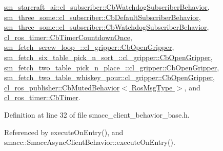 \hyperlink{classsm__starcraft__ai_1_1cl__subscriber_1_1CbWatchdogSubscriberBehavior_a74aa8ecc420589bda47b90877bc120a7}{sm\+\_\+starcraft\+\_\+ai\+::cl\+\_\+subscriber\+::\+Cb\+Watchdog\+Subscriber\+Behavior}, \hyperlink{classsm__three__some_1_1cl__subscriber_1_1CbDefaultSubscriberBehavior_a9d1f8dfb490a26b1fcdab1b740436837}{sm\+\_\+three\+\_\+some\+::cl\+\_\+subscriber\+::\+Cb\+Default\+Subscriber\+Behavior}, \hyperlink{classsm__three__some_1_1cl__subscriber_1_1CbWatchdogSubscriberBehavior_a6bd938abf54a95555182345a5e53cafe}{sm\+\_\+three\+\_\+some\+::cl\+\_\+subscriber\+::\+Cb\+Watchdog\+Subscriber\+Behavior}, \hyperlink{classcl__ros__timer_1_1CbTimerCountdownOnce_a613662c4a4106ece0ce1dee198d1aba2}{cl\+\_\+ros\+\_\+timer\+::\+Cb\+Timer\+Countdown\+Once}, \hyperlink{classsm__fetch__screw__loop__1_1_1cl__gripper_1_1CbOpenGripper_a2d50cf912c699839eda7c15a490e0b9f}{sm\+\_\+fetch\+\_\+screw\+\_\+loop\+\_\+::cl\+\_\+gripper\+::\+Cb\+Open\+Gripper}, \hyperlink{classsm__fetch__six__table__pick__n__sort__1_1_1cl__gripper_1_1CbOpenGripper_a78ac2d4b93c877f2f5786394b1e3afb6}{sm\+\_\+fetch\+\_\+six\+\_\+table\+\_\+pick\+\_\+n\+\_\+sort\+\_\+::cl\+\_\+gripper\+::\+Cb\+Open\+Gripper}, \hyperlink{classsm__fetch__two__table__pick__n__place__1_1_1cl__gripper_1_1CbOpenGripper_a08f95a8f05e33c1a04b77fa5f3465d78}{sm\+\_\+fetch\+\_\+two\+\_\+table\+\_\+pick\+\_\+n\+\_\+place\+\_\+::cl\+\_\+gripper\+::\+Cb\+Open\+Gripper}, \hyperlink{classsm__fetch__two__table__whiskey__pour_1_1cl__gripper_1_1CbOpenGripper_a8b2a4e3cd933033fcf83a73f4a7eb4f4}{sm\+\_\+fetch\+\_\+two\+\_\+table\+\_\+whiskey\+\_\+pour\+::cl\+\_\+gripper\+::\+Cb\+Open\+Gripper}, \hyperlink{classcl__ros__publisher_1_1CbMutedBehavior_a79376d9160e3bd44678a2c0d89f1b4de}{cl\+\_\+ros\+\_\+publisher\+::\+Cb\+Muted\+Behavior$<$ Ros\+Msg\+Type $>$}, and \hyperlink{classcl__ros__timer_1_1CbTimer_aceba45e86271cf1b7333e2f42c246a38}{cl\+\_\+ros\+\_\+timer\+::\+Cb\+Timer}.



Definition at line 32 of file smacc\+\_\+client\+\_\+behavior\+\_\+base.\+h.



Referenced by execute\+On\+Entry(), and smacc\+::\+Smacc\+Async\+Client\+Behavior\+::execute\+On\+Entry().


